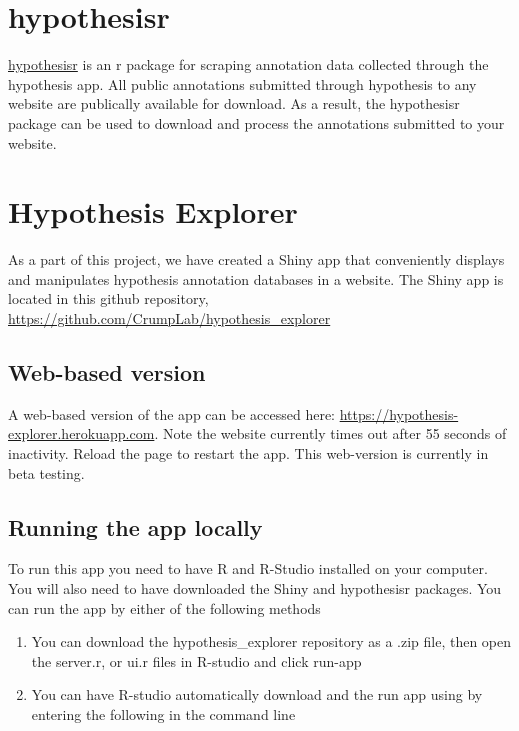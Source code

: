 \documentclass[
]{book}
\begin{document}
\hypertarget{hypothesisr}{%
\section{hypothesisr}\label{hypothesisr}}

\href{https://github.com/mdlincoln/hypothesisr}{hypothesisr} is an r package for scraping annotation data collected through the hypothesis app. All public annotations submitted through hypothesis to any website are publically available for download. As a result, the hypothesisr package can be used to download and process the annotations submitted to your website.

\hypertarget{hypothesis-explorer}{%
\section{Hypothesis Explorer}\label{hypothesis-explorer}}

As a part of this project, we have created a Shiny app that conveniently displays and manipulates hypothesis annotation databases in a website. The Shiny app is located in this github repository, \url{https://github.com/CrumpLab/hypothesis_explorer}

\hypertarget{web-based-version}{%
\subsection{Web-based version}\label{web-based-version}}

A web-based version of the app can be accessed here: \url{https://hypothesis-explorer.herokuapp.com}. Note the website currently times out after 55 seconds of inactivity. Reload the page to restart the app. This web-version is currently in beta testing.

\hypertarget{running-the-app-locally}{%
\subsection{Running the app locally}\label{running-the-app-locally}}

To run this app you need to have R and R-Studio installed on your computer. You will also need to have downloaded the Shiny and hypothesisr packages. You can run the app by either of the following methods

\begin{enumerate}
\def\labelenumi{\arabic{enumi}.}
\item
  You can download the hypothesis\_explorer repository as a .zip file, then open the server.r, or ui.r files in R-studio and click run-app
\item
  You can have R-studio automatically download and the run app using by entering the following in the command line
\end{enumerate}
\end{document}
